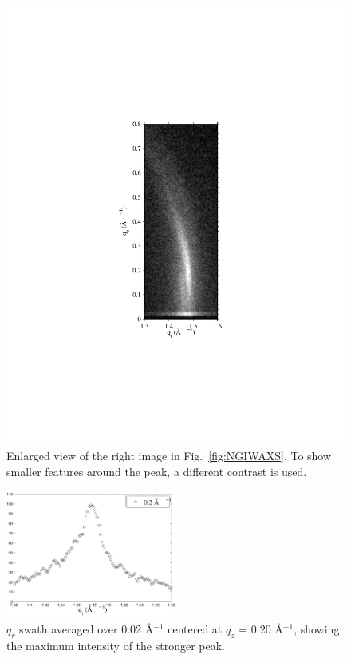 \begin{figure}[htbp]
  \centering
  \includegraphics[trim=100 170 100 170,clip,width=\textwidth]{figures/ripple/NGIWAXS/dmpc1_enlarge}
  \caption{Enlarged view of the right image in Fig.~\ref{fig:NGIWAXS}. To show 
  smaller features around the peak, a different contrast is used.}
  \label{fig:NGIWAXS_enlarge}
\end{figure}

\begin{figure}[htbp]
  \centering
  \includegraphics[width=0.5\textwidth]{figures/ripple/NGIWAXS/qrplot8}
  \caption[$q_r$ swath averaged over 0.02 \AA$^{-1}$ centered at 
  $q_z$ = 0.20 \AA$^{-1}$]{$q_r$ swath averaged over 0.02 \AA$^{-1}$ centered at 
  $q_z$ = 0.20 \AA$^{-1}$, showing the maximum intensity of the stronger
  peak.}
  \label{fig:strong_peak}
\end{figure}

